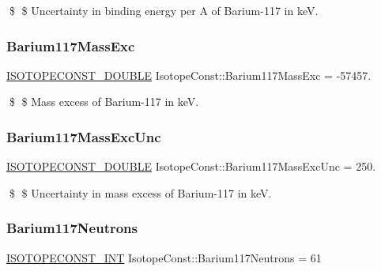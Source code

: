 \$ \$ Uncertainty in binding energy per A of Barium-\/117 in keV. \mbox{\label{group___isotope_const-_barium-_ba117_ga8d77f0e5d77ffb5cb61d1d70c5f85635}} 
\subsubsection{\texorpdfstring{Barium117\+Mass\+Exc}{Barium117MassExc}}
{\footnotesize\ttfamily \mbox{\hyperlink{group___isotope_const-_macros_ga8f45a7272ce02c0b4c65c44636ed719a}{I\+S\+O\+T\+O\+P\+E\+C\+O\+N\+S\+T\+\_\+\+D\+O\+U\+B\+LE}} Isotope\+Const\+::\+Barium117\+Mass\+Exc = -\/57457.}

\$ \$ Mass excess of Barium-\/117 in keV. \mbox{\label{group___isotope_const-_barium-_ba117_ga5e5c9c42b74f3c5ff88e09005ae6c1e8}} 
\subsubsection{\texorpdfstring{Barium117\+Mass\+Exc\+Unc}{Barium117MassExcUnc}}
{\footnotesize\ttfamily \mbox{\hyperlink{group___isotope_const-_macros_ga8f45a7272ce02c0b4c65c44636ed719a}{I\+S\+O\+T\+O\+P\+E\+C\+O\+N\+S\+T\+\_\+\+D\+O\+U\+B\+LE}} Isotope\+Const\+::\+Barium117\+Mass\+Exc\+Unc = 250.}

\$ \$ Uncertainty in mass excess of Barium-\/117 in keV. \mbox{\label{group___isotope_const-_barium-_ba117_gaa6f2687a5e7e70749087d0e7b5238ef2}} 
\subsubsection{\texorpdfstring{Barium117\+Neutrons}{Barium117Neutrons}}
{\footnotesize\ttfamily \mbox{\hyperlink{group___isotope_const-_macros_ga5f18360b3e99483a35c32d789e62621c}{I\+S\+O\+T\+O\+P\+E\+C\+O\+N\+S\+T\+\_\+\+I\+NT}} Isotope\+Const\+::\+Barium117\+Neutrons = 61}


